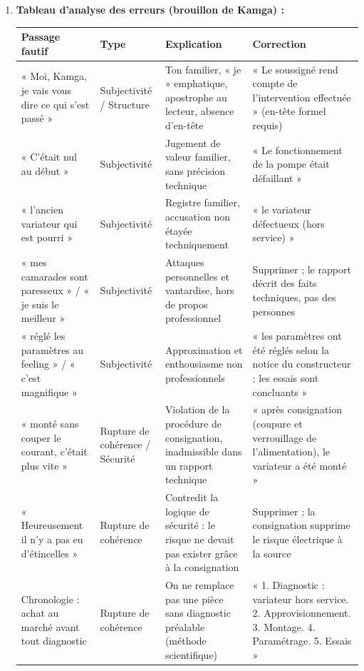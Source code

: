 \documentclass[11pt]{article}
\begin{document}
\begin{corrige}
\begin{enumerate}
    \item \textbf{Tableau d'analyse des erreurs (brouillon de Kamga) :}
    \begin{center}
    \begin{tabularx}{\linewidth}{|X|X|X|X|}\hline
    \textbf{Passage fautif} & \textbf{Type} & \textbf{Explication} & \textbf{Correction} \\ \hline
    « Moi, Kamga, je vais vous dire ce qui s'est passé » & Subjectivité / Structure & Ton familier, « je » emphatique, apostrophe au lecteur, absence d'en-tête & « Le soussigné rend compte de l'intervention effectuée » (en-tête formel requis) \\ \hline
    « C'était nul au début » & Subjectivité & Jugement de valeur familier, sans précision technique & « Le fonctionnement de la pompe était défaillant » \\ \hline
    « l'ancien variateur qui est pourri » & Subjectivité & Registre familier, accusation non étayée techniquement & « le variateur défectueux (hors service) » \\ \hline
    « mes camarades sont paresseux » / « je suis le meilleur » & Subjectivité & Attaques personnelles et vantardise, hors de propos professionnel & Supprimer ; le rapport décrit des faits techniques, pas des personnes \\ \hline
    « réglé les paramètres au feeling » / « c'est magnifique » & Subjectivité & Approximation et enthousiasme non professionnels & « les paramètres ont été réglés selon la notice du constructeur ; les essais sont concluants » \\ \hline
    « monté sans couper le courant, c'était plus vite » & Rupture de cohérence / Sécurité & Violation de la procédure de consignation, inadmissible dans un rapport technique & « après consignation (coupure et verrouillage de l'alimentation), le variateur a été monté » \\ \hline
    « Heureusement il n'y a pas eu d'étincelles » & Rupture de cohérence & Contredit la logique de sécurité : le risque ne devait pas exister grâce à la consignation & Supprimer ; la consignation supprime le risque électrique à la source \\ \hline
    Chronologie : achat au marché avant tout diagnostic & Rupture de cohérence & On ne remplace pas une pièce sans diagnostic préalable (méthode scientifique) & « 1. Diagnostic : variateur hors service. 2. Approvisionnement. 3. Montage. 4. Paramétrage. 5. Essais » \\ \hline

\end{tabularx}
\end{center}
\end{enumerate}
\end{corrige}
\end{document}
